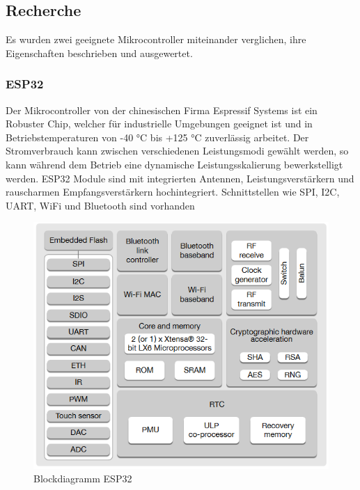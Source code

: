 \subsection{Recherche}\label{subsec: Recherche} 
Es wurden zwei geeignete Mikrocontroller miteinander verglichen, ihre Eigenschaften beschrieben und ausgewertet. 

\subsubsection{ESP32}
Der Mikrocontroller von der chinesischen Firma Espressif Systems ist ein Robuster Chip, welcher für industrielle Umgebungen geeignet ist und in Betriebstemperaturen von -40 °C bis +125 °C zuverlässig arbeitet. Der Stromverbrauch kann zwischen verschiedenen Leistungsmodi gewählt werden, so kann während dem Betrieb eine dynamische Leistungsskalierung bewerkstelligt werden. ESP32 Module sind mit integrierten Antennen, Leistungsverstärkern und rauscharmen Empfangsverstärkern hochintegriert. Schnittstellen wie SPI, I2C, UART, WiFi und Bluetooth sind vorhanden

\begin{figure}[H]
	\centering
	\includegraphics[width=\textwidth]{graphics/blockdiagrammESP32.PNG}
	\caption{Blockdiagramm ESP32 \cite{espressif_esp32-wroom-32_datasheet_en_2019}}
	
	\label{pic: blockdiagrammESP32}
\end{figure} 

